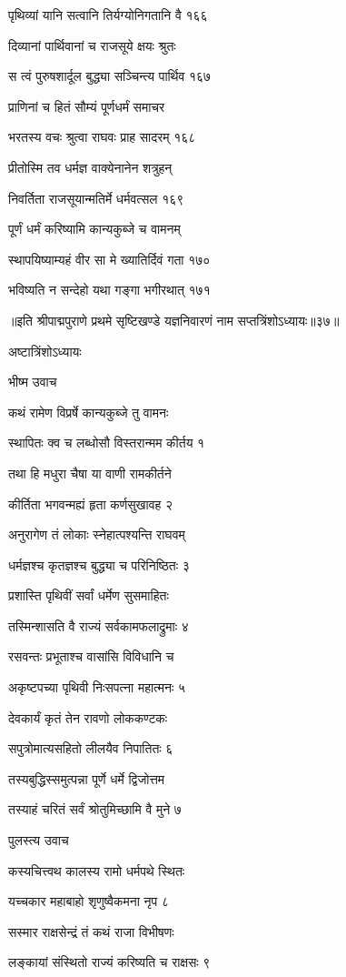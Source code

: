पृथिव्यां यानि सत्वानि तिर्यग्योनिगतानि वै १६६

दिव्यानां पार्थिवानां च राजसूये क्षयः श्रुतः

स त्वं पुरुषशार्दूल बुद्ध्या सञ्चिन्त्य पार्थिव १६७

प्राणिनां च हितं सौम्यं पूर्णधर्मं समाचर

भरतस्य वचः श्रुत्वा राघवः प्राह सादरम् १६८

प्रीतोस्मि तव धर्मज्ञ वाक्येनानेन शत्रुहन्

निवर्तिता राजसूयान्मतिर्मे धर्मवत्सल १६९

पूर्णं धर्मं करिष्यामि कान्यकुब्जे च वामनम्

स्थापयिष्याम्यहं वीर सा मे ख्यातिर्दिवं गता १७०

भविष्यति न सन्देहो यथा गङ्गा भगीरथात् १७१ 

॥इति श्रीपाद्मपुराणे प्रथमे सृष्टिखण्डे यज्ञनिवारणं नाम सप्तत्रिंशोऽध्यायः॥३७॥

अष्टात्रिंशोऽध्यायः

भीष्म उवाच

कथं रामेण विप्रर्षे कान्यकुब्जे तु वामनः

स्थापितः क्व च लब्धोसौ विस्तरान्मम कीर्तय १

तथा हि मधुरा चैषा या वाणी रामकीर्तने

कीर्तिता भगवन्मह्यं हृता कर्णसुखावह २

अनुरागेण तं लोकाः स्नेहात्पश्यन्ति राघवम्

धर्मज्ञश्च कृतज्ञश्च बुद्ध्या च परिनिष्ठितः ३

प्रशास्ति पृथिवीं सर्वां धर्मेण सुसमाहितः

तस्मिन्शासति वै राज्यं सर्वकामफलाद्रुमाः ४

रसवन्तः प्रभूताश्च वासांसि विविधानि च

अकृष्टपच्या पृथिवी निःसपत्ना महात्मनः ५

देवकार्यं कृतं तेन रावणो लोककण्टकः

सपुत्रोमात्यसहितो लीलयैव निपातितः ६

तस्यबुद्धिस्समुत्पन्ना पूर्णे धर्मे द्विजोत्तम

तस्याहं चरितं सर्वं श्रोतुमिच्छामि वै मुने ७

पुलस्त्य उवाच

कस्यचित्त्वथ कालस्य रामो धर्मपथे स्थितः

यच्चकार महाबाहो शृणुष्वैकमना नृप ८

सस्मार राक्षसेन्द्रं तं कथं राजा विभीषणः

लङ्कायां संस्थितो राज्यं करिष्यति च राक्षसः ९

